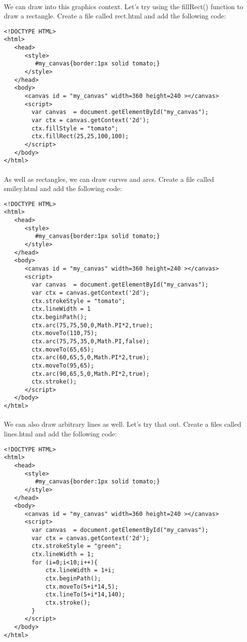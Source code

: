 \documentclass[10pt, a4paper]{article}
\begin{document}
\paragraph{} We can draw into this graphics context. Let's try using the fillRect() function to draw a rectangle. Create a file called rect.html and add the following code:

\begin{lstlisting}
<!DOCTYPE HTML>
<html>
   <head>
      <style>
         #my_canvas{border:1px solid tomato;}
      </style>
   </head>
   <body>
      <canvas id = "my_canvas" width=360 height=240 ></canvas>
      <script>
        var canvas  = document.getElementById("my_canvas");
        var ctx = canvas.getContext('2d');
        ctx.fillStyle = "tomato";
        ctx.fillRect(25,25,100,100);
      </script>
   </body>
</html>
\end{lstlisting}

\paragraph{} As well as rectangles, we can draw curves and arcs. Create a file called smiley.html and add the following code:

\begin{lstlisting}
<!DOCTYPE HTML>
<html>
   <head>
      <style>
         #my_canvas{border:1px solid tomato;}
      </style>
   </head>
   <body>
      <canvas id = "my_canvas" width=360 height=240 ></canvas>
      <script>
        var canvas  = document.getElementById("my_canvas");
        var ctx = canvas.getContext('2d');
        ctx.strokeStyle = "tomato";
        ctx.lineWidth = 1
        ctx.beginPath();
        ctx.arc(75,75,50,0,Math.PI*2,true);  
        ctx.moveTo(110,75);
        ctx.arc(75,75,35,0,Math.PI,false);   
        ctx.moveTo(65,65);
        ctx.arc(60,65,5,0,Math.PI*2,true); 
        ctx.moveTo(95,65);
        ctx.arc(90,65,5,0,Math.PI*2,true);  
        ctx.stroke();            
      </script>
   </body>
</html>
\end{lstlisting}

\paragraph{} We can also draw arbitrary lines as well. Let's try that out. Create a files called lines.html and add the following code:

\begin{lstlisting}
<!DOCTYPE HTML>
<html>
   <head>
      <style>
         #my_canvas{border:1px solid tomato;}
      </style>
   </head>
   <body>
      <canvas id = "my_canvas" width=360 height=240 ></canvas>
      <script>
        var canvas  = document.getElementById("my_canvas");
        var ctx = canvas.getContext('2d');
        ctx.strokeStyle = "green";
        ctx.lineWidth = 1;
        for (i=0;i<10;i++){
            ctx.lineWidth = 1+i;
            ctx.beginPath();
            ctx.moveTo(5+i*14,5);
            ctx.lineTo(5+i*14,140);
            ctx.stroke();
        }
      </script>
   </body>
</html>
\end{lstlisting}
\end{document}
